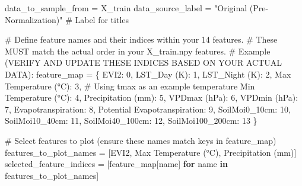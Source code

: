 \documentclass[
  letterpaper,
  DIV=11,
  numbers=noendperiod]{scrreprt}
\newenvironment{Shaded}{\begin{snugshade}}{\end{snugshade}}
\newcommand{\CommentTok}[1]{\textcolor[rgb]{0.37,0.37,0.37}{#1}}
\newcommand{\ControlFlowTok}[1]{\textcolor[rgb]{0.00,0.23,0.31}{\textbf{#1}}}
\newcommand{\DecValTok}[1]{\textcolor[rgb]{0.68,0.00,0.00}{#1}}
\newcommand{\KeywordTok}[1]{\textcolor[rgb]{0.00,0.23,0.31}{\textbf{#1}}}
\newcommand{\NormalTok}[1]{\textcolor[rgb]{0.00,0.23,0.31}{#1}}
\newcommand{\OperatorTok}[1]{\textcolor[rgb]{0.37,0.37,0.37}{#1}}
\newcommand{\StringTok}[1]{\textcolor[rgb]{0.13,0.47,0.30}{#1}}
\begin{document}
\begin{Shaded}
\begin{Highlighting}[]
\NormalTok{data\_to\_sample\_from }\OperatorTok{=}\NormalTok{ X\_train}
\NormalTok{data\_source\_label }\OperatorTok{=} \StringTok{"Original (Pre{-}Normalization)"} \CommentTok{\# Label for titles}

\CommentTok{\# Define feature names and their indices within your 14 features.}
\CommentTok{\# These MUST match the actual order in your X\_train.npy features.}
\CommentTok{\# Example (VERIFY AND UPDATE THESE INDICES BASED ON YOUR ACTUAL DATA):}
\NormalTok{feature\_map }\OperatorTok{=}\NormalTok{ \{}
    \StringTok{\textquotesingle{}EVI2\textquotesingle{}}\NormalTok{: }\DecValTok{0}\NormalTok{,}
    \StringTok{\textquotesingle{}LST\_Day (K)\textquotesingle{}}\NormalTok{: }\DecValTok{1}\NormalTok{,}
    \StringTok{\textquotesingle{}LST\_Night (K)\textquotesingle{}}\NormalTok{: }\DecValTok{2}\NormalTok{,}
    \StringTok{\textquotesingle{}Max Temperature (°C)\textquotesingle{}}\NormalTok{: }\DecValTok{3}\NormalTok{,  }\CommentTok{\# Using tmax as an example temperature}
    \StringTok{\textquotesingle{}Min Temperature (°C)\textquotesingle{}}\NormalTok{: }\DecValTok{4}\NormalTok{,}
    \StringTok{\textquotesingle{}Precipitation (mm)\textquotesingle{}}\NormalTok{: }\DecValTok{5}\NormalTok{,}
    \StringTok{\textquotesingle{}VPDmax (hPa)\textquotesingle{}}\NormalTok{: }\DecValTok{6}\NormalTok{,}
    \StringTok{\textquotesingle{}VPDmin (hPa)\textquotesingle{}}\NormalTok{: }\DecValTok{7}\NormalTok{,}
    \StringTok{\textquotesingle{}Evapotranspiration\textquotesingle{}}\NormalTok{: }\DecValTok{8}\NormalTok{,}
    \StringTok{\textquotesingle{}Potential Evapotranspiration\textquotesingle{}}\NormalTok{: }\DecValTok{9}\NormalTok{,}
    \StringTok{\textquotesingle{}SoilMoi0\_10cm\textquotesingle{}}\NormalTok{: }\DecValTok{10}\NormalTok{,}
    \StringTok{\textquotesingle{}SoilMoi10\_40cm\textquotesingle{}}\NormalTok{: }\DecValTok{11}\NormalTok{,}
    \StringTok{\textquotesingle{}SoilMoi40\_100cm\textquotesingle{}}\NormalTok{: }\DecValTok{12}\NormalTok{,}
    \StringTok{\textquotesingle{}SoilMoi100\_200cm\textquotesingle{}}\NormalTok{: }\DecValTok{13}
\NormalTok{\}}

\CommentTok{\# Select features to plot (ensure these names match keys in feature\_map)}
\NormalTok{features\_to\_plot\_names }\OperatorTok{=}\NormalTok{ [}\StringTok{\textquotesingle{}EVI2\textquotesingle{}}\NormalTok{, }\StringTok{\textquotesingle{}Max Temperature (°C)\textquotesingle{}}\NormalTok{, }\StringTok{\textquotesingle{}Precipitation (mm)\textquotesingle{}}\NormalTok{]}
\NormalTok{selected\_feature\_indices }\OperatorTok{=}\NormalTok{ [feature\_map[name] }\ControlFlowTok{for}\NormalTok{ name }\KeywordTok{in}\NormalTok{ features\_to\_plot\_names]}


\end{Highlighting}
\end{Shaded}
\end{document}
